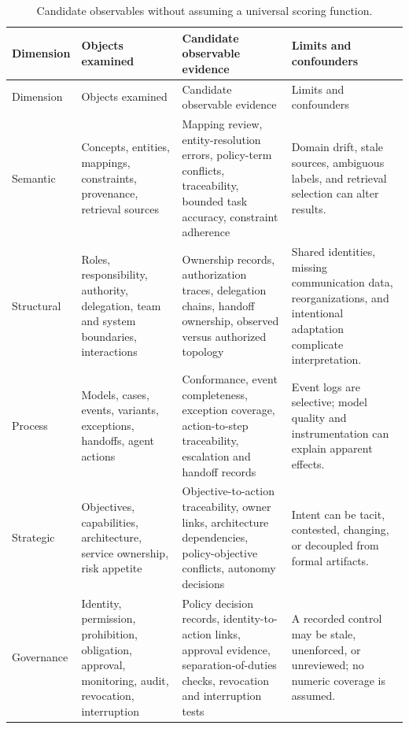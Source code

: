 \documentclass[11pt,letterpaper]{article}
\begin{document}
\begingroup\scriptsize
\begin{longtable}{p{} p{} p{} p{}}
\caption{Candidate observables without assuming a universal scoring function.}\label{tab:observables}\\
\toprule
Dimension & Objects examined & Candidate observable evidence & Limits and confounders \\
\midrule
\endfirsthead
\toprule
Dimension & Objects examined & Candidate observable evidence & Limits and confounders \\
\midrule
\endhead
Semantic & Concepts, entities, mappings, constraints, provenance, retrieval sources & Mapping review, entity-resolution errors, policy-term conflicts, traceability, bounded task accuracy, constraint adherence & Domain drift, stale sources, ambiguous labels, and retrieval selection can alter results. \\
Structural & Roles, responsibility, authority, delegation, team and system boundaries, interactions & Ownership records, authorization traces, delegation chains, handoff ownership, observed versus authorized topology & Shared identities, missing communication data, reorganizations, and intentional adaptation complicate interpretation. \\
Process & Models, cases, events, variants, exceptions, handoffs, agent actions & Conformance, event completeness, exception coverage, action-to-step traceability, escalation and handoff records & Event logs are selective; model quality and instrumentation can explain apparent effects. \\
Strategic & Objectives, capabilities, architecture, service ownership, risk appetite & Objective-to-action traceability, owner links, architecture dependencies, policy-objective conflicts, autonomy decisions & Intent can be tacit, contested, changing, or decoupled from formal artifacts. \\
Governance & Identity, permission, prohibition, obligation, approval, monitoring, audit, revocation, interruption & Policy decision records, identity-to-action links, approval evidence, separation-of-duties checks, revocation and interruption tests & A recorded control may be stale, unenforced, or unreviewed; no numeric coverage is assumed. \\
\bottomrule
\end{longtable}
\endgroup
\end{document}
